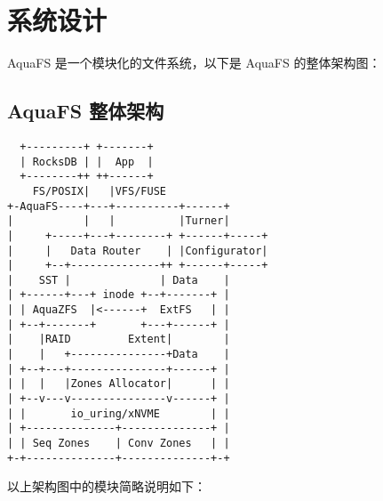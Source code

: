 \section{系统设计}

AquaFS 是一个模块化的文件系统，以下是 AquaFS 的整体架构图：

\subsection{AquaFS 整体架构}

\begin{lstlisting}
  +---------+ +-------+
  | RocksDB | |  App  |
  +--------++ ++------+
    FS/POSIX|   |VFS/FUSE
+-AquaFS----+---+----------+------+
|           |   |          |Turner|
|     +-----+---+--------+ +------+-----+
|     |   Data Router    | |Configurator|
|     +--+--------------++ +------+-----+
|    SST |              | Data    |
| +------+---+ inode +--+-------+ |
| | AquaZFS  |<------+  ExtFS   | |
| +--+-------+       +---+------+ |
|    |RAID         Extent|        |
|    |   +---------------+Data    |
| +--+---+---------------+------+ |
| |  |   |Zones Allocator|      | |
| +--v---v---------------v------+ |
| |       io_uring/xNVME        | |
| +--------------+--------------+ |
| | Seq Zones    | Conv Zones   | |
+-+--------------+--------------+-+
\end{lstlisting}

以上架构图中的模块简略说明如下：

